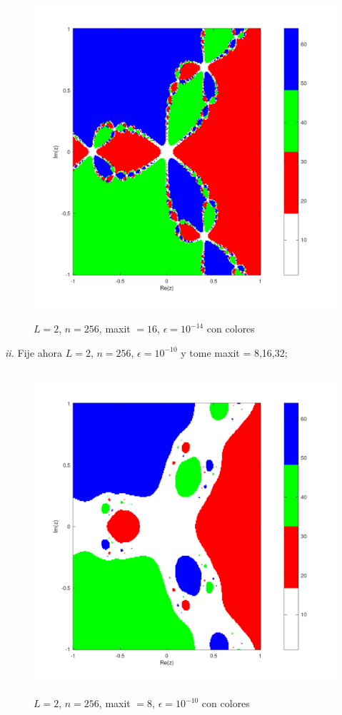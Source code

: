 \documentclass{article} %
\begin{document}
\begin{figure}[H]
    \centering
    \includegraphics[width=152mm, height=120mm]{images/L2n256maxit16e10-14color.png}
    \caption{$L=2$, $n=256$, maxit $=16$, $\epsilon=10^{-14}$ con colores}
\end{figure}

\newpage

\textit{ii.} Fije ahora $L=2$, $n=256$, $\epsilon=10^{-10}$ y tome maxit = 8,16,32;

\begin{figure}[H]
    \centering
    \includegraphics[width=152mm, height=120mm]{images/L2n256maxit8e10-10color.png}
    \caption{$L=2$, $n=256$, maxit $=8$, $\epsilon=10^{-10}$ con colores}
\end{figure}
\end{document}
